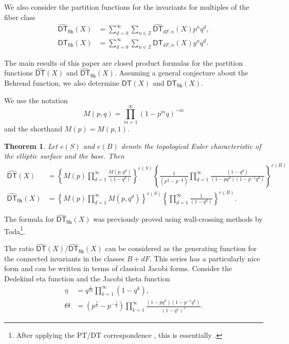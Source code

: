 \documentclass[12pt]{amsart}
\newtheorem{theorem}{Theorem}%
\theoremstyle{definition}
\newcommand{\ZZ} {\mathbb{Z}}		%
\newcommand{\DT}{\mathsf{DT}}
\newcommand{\DThat}{\widehat{\DT}}
\newcommand{\fiber}{\mathsf{fib}}
\newcommand{\half}{\frac{1}{2}}
\begin{document}
We also consider the partition functions for the invariants for
multiples of the fiber class
\begin{align*}
\DThat_{\fiber}(X)& = \sum_{d= 0}^{\infty} \sum_{n \in \ZZ} \DThat_{dF,n}(X) p^{n} q^{d} ,\\
\DT_{\fiber}(X)& = \sum_{d= 0}^{\infty} \sum_{n \in \ZZ} \DT_{dF,n}(X) y^{n} q^{d} .
\end{align*}


The main results of this paper are closed product formulas for the
partition functions $\DThat (X)$ and $\DThat_{\fiber}(X)$. Assuming a
general conjecture about the Behrend function, we also determine $\DT
(X)$ and $\DT_{\fiber}(X)$.

We use the notation
\[
M(p,q) = \prod_{m=1}^{\infty} (1-p^{m}q)^{-m}
\]
and the shorthand $M(p)=M(p,1)$.

\begin{theorem}\label{thm: main thm -- formulas for DT and DTfiber}
Let $e(S)$ and $e(B)$ denote the topological Euler characteristic of
the elliptic surface and the base. Then
\begin{align*}
\DThat (X) &= \left \{M(p)\prod_{d=1}^{\infty}
\frac{M(p,q^{d})}{(1-q^{d})} \right\}^{e(S)}
\left\{\frac{1}{(p^{\half}-p^{-\half})}\prod_{d=1}^{\infty}\frac{(1-q^{d})}{(1-pq^{d})(1-p^{-1}q^{d})}
\right\}^{e(B)} \\
\DThat_{\fiber}(X) &= \left\{M(p)\prod_{d=1}^{\infty}M(p,q^{d})
\right\}^{e(S)} \left\{\prod_{d=1}^{\infty}\frac{1}{(1-q^{d})}
\right\}^{e(B)}.
\end{align*}
\end{theorem}

The formula for $\DThat_{\fiber}(X)$ was previously proved using
wall-crossing methods by Toda\footnote{After applying the PT/DT
correspondence \cite{Bridgeland-PTDT}, this is essentially 
\cite[Thm~6.9]{Toda-2012-Kyoto}.}.

The ratio $\DThat (X)/\DThat_{\fiber}(X)$ can be considered as the
generating function for the connected invariants in the classes
$B+dF$. This series has a particularly nice form and can be written in
terms of classical Jacobi forms.  Consider the Dedekind eta function
and the Jacobi theta function
\begin{align*}
\eta &= q^{\frac{1}{24}} \prod_{k=1}^{\infty}(1-q^k), \\
\Theta &= 
(p^{\frac{1}{2}} - p^{-\frac{1}{2}}) \prod_{k=1}^{\infty} \frac{(1-p q^k) (1-p^{-1} q^k)}{(1-q^k)^2}.
\end{align*}
\end{document}
